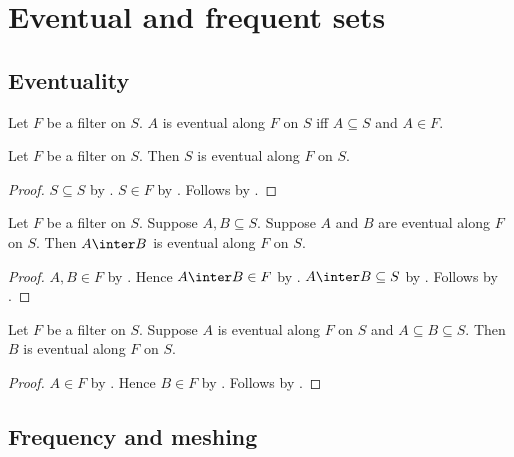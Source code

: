 \section{Eventual and frequent sets}



\subsection{Eventuality}

\begin{definition}\label{filter_eventual}
    Let $F$ be a filter on $S$.
    $A$ is eventual along $F$ on $S$ iff $A\subseteq S$ and $A\in F$.
\end{definition}

\begin{proposition}\label{filter_eventual_carrier}
    Let $F$ be a filter on $S$.
    Then $S$ is eventual along $F$ on $S$.
\end{proposition}
\begin{proof}
    $S\subseteq S$ by .
    $S\in F$ by .
    Follows by .
\end{proof}

\begin{proposition}\label{filter_eventual_intersection}
    Let $F$ be a filter on $S$.
    Suppose $A,B\subseteq S$.
    Suppose $A$ and $B$ are eventual along $F$ on $S$.
    Then $A\inter B$ is eventual along $F$ on $S$.
\end{proposition}
\begin{proof}
    $A,B\in F$ by .
    Hence $A\inter B\in F$ by .
    $A\inter B\subseteq S$ by .
    Follows by .
\end{proof}

\begin{proposition}\label{filter_eventual_superset}
    Let $F$ be a filter on $S$.
    Suppose $A$ is eventual along $F$ on $S$ and $A\subseteq B\subseteq S$.
    Then $B$ is eventual along $F$ on $S$.
\end{proposition}
\begin{proof}
    $A\in F$ by .
    Hence $B\in F$ by .
    Follows by .
\end{proof}

\subsection{Frequency and meshing}

